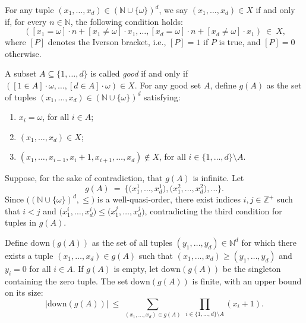 \documentclass[12pt]{article}
\begin{document}
	\medskip
	
	For any tuple \((x_{1}, \ldots, x_{d}) \in (\mathbb{N} \cup
	\{\omega\})^{d}\), we say \((x_{1}, \ldots, x_{d}) \in X\) if and only if,
	for every \(n \in \mathbb{N}\), the following condition holds:
	\[ ([x_{1} = \omega] \cdot n + [x_{1} \neq \omega] \cdot x_{1}, \ldots,
	[x_{d} = \omega] \cdot n + [x_{d} \neq \omega] \cdot x_{1}) \ \in \ X
	\text{,} \]
	where \([P]\) denotes the Iverson bracket, i.e., \([P] = 1\) if \(P\) is
	true, and \([P] = 0\) otherwise.
	
	\medskip
	
	A subset \(A \subseteq \{1, \ldots, d\}\) is called \textit{good} if and
	only if \(([1 \in A] \cdot \omega, \ldots, [d \in A] \cdot \omega) \in X\).
	For any good set \(A\), define \(g(A)\) as the set of tuples \((x_{1},
	\ldots, x_{d}) \in (\mathbb{N} \cup \{\omega\})^{d}\) satisfying:
	\begin{enumerate}
		\item \(x_{i} = \omega\), for all \(i \in A\);
		\item \((x_{1}, \ldots, x_{d}) \in X\);
		\item \((x_{1}, \ldots, x_{i - 1}, x_{i} + 1, x_{i + 1}, \ldots, x_{d})
		      \notin X\), for all \(i \in \{1, \ldots, d\} \setminus A\).
	\end{enumerate}
	
	Suppose, for the sake of contradiction, that \(g(A)\) is infinite. Let
	\[ g(A) \ = \ \big\{ \big( x_{1}^{1}, \ldots, x_{d}^{1} \big), \big(
	x_{1}^{2}, \ldots, x_{d}^{2} \big), \ldots \big\} \text{.} \]
	Since \(\big( (\mathbb{N} \cup \{\omega\})^{d}, \leqslant \! \big)\) is a
	well-quasi-order, there exist indices \(i, j \in \mathbb{Z}^{+}\) such that
	\(i < j\) and \(\big( x_{1}^{i}, \ldots, x_{d}^{i} \big) \leqslant \big(
	x_{1}^{j}, \ldots, x_{d}^{j} \big)\), contradicting the third condition for
	tuples in \(g(A)\).
	
	\medskip
	
	Define \(\text{down}(g(A))\) as the set of all tuples \((y_{1}, \ldots,
	y_{d}) \in \mathbb{N}^{d}\) for which there exists a tuple \((x_{1}, \ldots,
	x_{d}) \in g(A)\) such that \((x_{1}, \ldots, x_{d}) \geqslant (y_{1},
	\ldots, y_{d})\) and \(y_{i} = 0\) for all \(i \in A\). If \(g(A)\) is
	empty, let \(\text{down}(g(A))\) be the singleton containing the zero tuple.
	The set \(\text{down}(g(A))\) is finite, with an upper bound on its size:
	\[ |\text{down}(g(A))| \ \leqslant \ \sum\limits_{(x_{1}, \ldots, x_{d}) \in
	g(A)} \ \prod\limits_{i \in \{1, \ldots, d\} \setminus A} (x_{i} + 1)
	\text{.} \]
	
\end{document}
